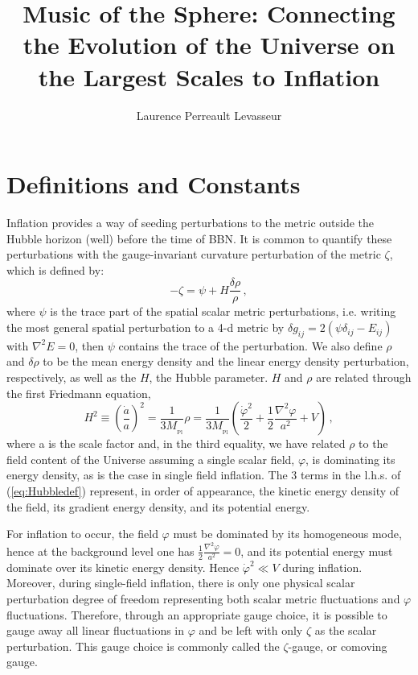 \documentclass[prd, onecolumn, floatfix, letterpaper, nofootinbib, amsmath, amssymb, superscriptaddress]{revtex4}
\renewcommand{\(}{\left(}
\renewcommand{\)}{\right)}
\renewcommand{\[}{\left[}
\renewcommand{\]}{\right]}
\def\be{\begin{equation}}
\def\ee{\end{equation}}
\newcommand{\Mp}{M_{_\mathrm{Pl}}}
\begin{document}
\title{Music of the Sphere: Connecting the Evolution of the Universe on the Largest Scales to Inflation}


\author{ Laurence Perreault Levasseur}
\maketitle



\section{Definitions and Constants}

Inflation provides a way of seeding perturbations to the metric outside the Hubble horizon (well) before the time of BBN. It is common to quantify these perturbations with the gauge-invariant curvature perturbation of the metric $\zeta$, which is defined by:
\be
	-\zeta=\psi+H\frac{\delta\rho}{\rho}\, ,
\ee
where $\psi$ is the trace part of the spatial scalar metric perturbations, i.e. writing the most general spatial perturbation to a 4-d metric by $\delta g_{ij}=2(\psi\delta_{ij}-E_{ij})$ with $\nabla^2E=0$, then $\psi$ contains the trace of the perturbation. We also define $\rho$ and $\delta \rho$ to be the mean energy density and the linear energy density perturbation, respectively, as well as the $H$, the Hubble parameter. $H$ and $\rho$ are related through the first Friedmann equation,
\be	
\label{eq:Hubbledef}
	H^2\equiv \left(\frac{\dot{a}}{a}\right)^2=\frac{1}{3\Mp}\rho=\frac{1}{3\Mp}\left( \frac{\dot\varphi^2}{2}+\frac{1}{2}\frac{\nabla^2\varphi}{a^2}+V \right)\, ,
\ee
 where a is the scale factor and, in the third equality, we have related $\rho$ to the field content of the Universe assuming a single scalar field, $\varphi$, is dominating its energy density, as is the case in single field inflation. The 3 terms in the l.h.s. of (\ref{eq:Hubbledef}) represent, in order of appearance, the kinetic energy density of the field, its gradient energy density, and its potential energy. 
 
 For inflation to occur, the field $\varphi$ must be dominated by its homogeneous mode, hence at the background level one has $\frac{1}{2}\frac{\nabla^2\varphi}{a^2}=0$, and its potential energy must dominate over its kinetic energy density. Hence $\dot\varphi^2\ll V$ during inflation. Moreover, during single-field inflation, there is only one physical scalar perturbation degree of freedom representing both scalar metric fluctuations and $\varphi$ fluctuations. Therefore, through an appropriate gauge choice, it is possible to gauge away all linear fluctuations in $\varphi$ and be left with only $\zeta$ as the scalar perturbation. This gauge choice is commonly called the $\zeta$-gauge, or comoving gauge.
\end{document}
